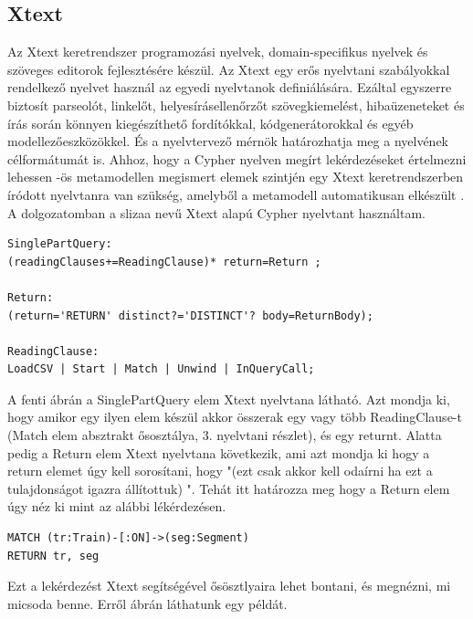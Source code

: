 \subsection{Xtext}

Az Xtext keretrendszer programozási nyelvek,  domain-specifikus nyelvek és szöveges editorok fejlesztésére készül. Az Xtext  
egy erős nyelvtani szabályokkal rendelkező nyelvet használ az egyedi nyelvtanok definiálására. Ezáltal
egyszerre biztosít parseolót, linkelőt, helyesírásellenőrzőt szövegkiemelést, hibaüzeneteket és  írás során könnyen kiegészíthető fordítókkal, kódgenerátorokkal és egyéb modellezőeszközökkel. És a nyelvtervező mérnök határozhatja meg a nyelvének célformátumát is. Ahhoz, hogy a Cypher nyelven megírt lekérdezéseket értelmezni lehessen 
-ös metamodellen megismert elemek szintjén egy Xtext \cite{xText} keretrendszerben íródott nyelvtanra van szükség, amelyből a metamodell automatikusan elkészült . A dolgozatomban a slizaa\cite{slizaa_2018} nevű Xtext alapú Cypher nyelvtant használtam.

\begin{lstlisting}[style=cyphersmall]
SinglePartQuery:
(readingClauses+=ReadingClause)* return=Return ;

Return:
(return='RETURN' distinct?='DISTINCT'? body=ReturnBody);

ReadingClause:
LoadCSV | Start | Match | Unwind | InQueryCall;
\end{lstlisting}



A fenti ábrán a SinglePartQuery elem Xtext nyelvtana látható. Azt mondja ki,
hogy amikor egy ilyen elem készül akkor összerak egy vagy több ReadingClause-t (Match elem absztrakt ősosztálya, 3. nyelvtani részlet),
és egy returnt. Alatta pedig a Return elem Xtext nyelvtana következik, ami azt mondja ki hogy a return
elemet úgy kell sorosítani, hogy "(ezt csak akkor kell odaírni ha ezt a tulajdonságot igazra
állítottuk) ". Tehát itt határozza meg hogy a Return elem úgy néz ki  mint az alábbi lékérdezésen.

\begin{lstlisting}[style=cyphersmall]
MATCH (tr:Train)-[:ON]->(seg:Segment)
RETURN tr, seg	
\end{lstlisting} 

Ezt a lekérdezést Xtext segítségével ősösztlyaira lehet bontani, és megnézni, mi micsoda benne. Erről   ábrán láthatunk egy példát.

